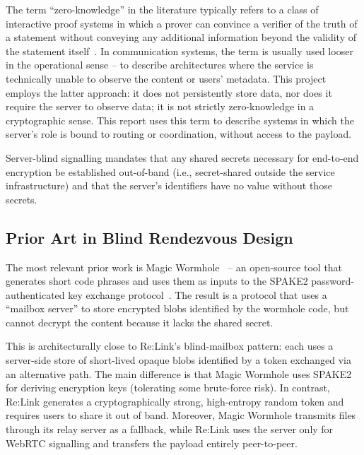 \documentclass[12pt,a4paper,oneside]{report}
\begin{document}
The term ``zero-knowledge'' in the literature typically refers to a class of interactive proof systems in which a prover can convince a verifier of the truth of a statement without conveying any additional information beyond the validity of the statement itself~\cite{goldwasser1989}. In communication systems, the term is usually used looser in the operational sense -- to describe architectures where the service is technically unable to observe the content or users' metadata. This project employs the latter approach: it does not persistently store data, nor does it require the server to observe data; it is not strictly zero-knowledge in a cryptographic sense. This report uses this term to describe systems in which the server's role is bound to routing or coordination, without access to the payload.

Server-blind signalling mandates that any shared secrets necessary for end-to-end encryption be established out-of-band (i.e., secret-shared outside the service infrastructure) and that the server's identifiers have no value without those secrets.


\subsection{Prior Art in Blind Rendezvous Design}
\label{sec:blind-rendezvous}

The most relevant prior work is Magic Wormhole~\cite{magicwormhole} -- an open-source tool that generates short code phrases and uses them as inputs to the SPAKE2 password-authenticated key exchange protocol~\cite{rfc9382}. The result is a protocol that uses a ``mailbox server'' to store encrypted blobs identified by the wormhole code, but cannot decrypt the content because it lacks the shared secret.

This is architecturally close to Re:Link's blind-mailbox pattern: each uses a server-side store of short-lived opaque blobs identified by a token exchanged via an alternative path. The main difference is that Magic Wormhole uses SPAKE2 for deriving encryption keys (tolerating some brute-force risk). In contrast, Re:Link generates a cryptographically strong, high-entropy random token and requires users to share it out of band. Moreover, Magic Wormhole transmits files through its relay server as a fallback, while Re:Link uses the server only for WebRTC signalling and transfers the payload entirely peer-to-peer.
\end{document}
